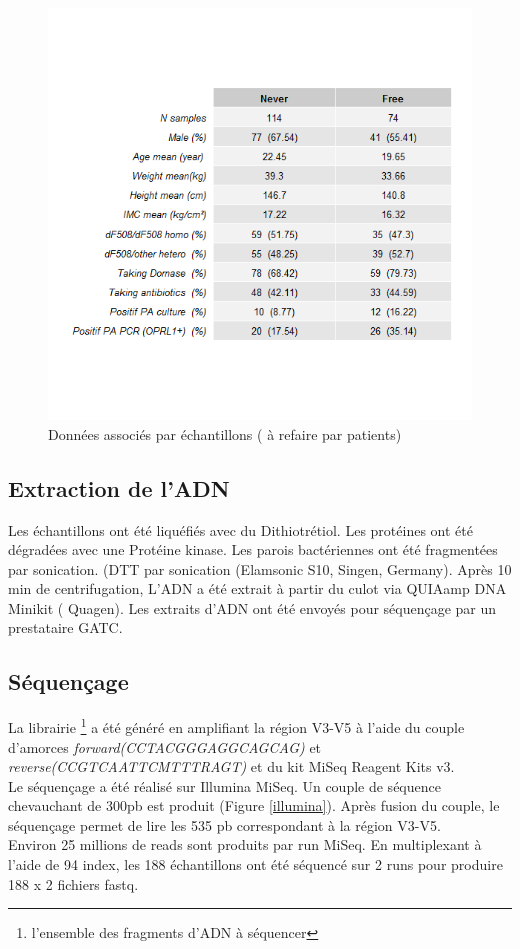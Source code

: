 \documentclass[12pt,a4paper]{article}
\begin{document}
\begin{figure}[ht]
\begin{center}
\includegraphics[scale=0.8]{img/summary.png}\hfill
\end{center}
\caption{Données associés par échantillons ( à refaire par patients)}
\label{summary}
\end{figure}



\subsection{Extraction de l’ADN}

Les échantillons ont été liquéfiés avec du Dithiotrétiol. Les protéines ont été dégradées avec une Protéine kinase.
Les parois bactériennes ont été fragmentées par sonication. (DTT par sonication (Elamsonic S10, Singen, Germany). Après 10 min de centrifugation, L’ADN a été extrait à partir du culot via QUIAamp DNA Minikit ( Quagen).
Les extraits d’ADN ont été envoyés pour séquençage par un prestataire GATC.

\subsection{Séquençage}
La librairie \footnote{l'ensemble des fragments d'ADN à séquencer} a été généré en amplifiant la région V3-V5 à l’aide du couple d’amorces  \textit{forward(CCTACGGGAGGCAGCAG)} et \textit{reverse(CCGTCAATTCMTTTRAGT)} et du kit MiSeq Reagent Kits v3. \\
Le séquençage a été réalisé sur Illumina MiSeq. Un couple de séquence chevauchant de 300pb est produit (Figure \ref{illumina}). Après fusion du couple, le séquençage permet de lire les 535 pb correspondant à la région V3-V5.\\
Environ 25 millions de reads sont produits par run MiSeq. En multiplexant à l’aide de 94 index, les 188 échantillons ont été séquencé sur 2 runs pour produire 188 x 2 fichiers fastq.
\end{document}
